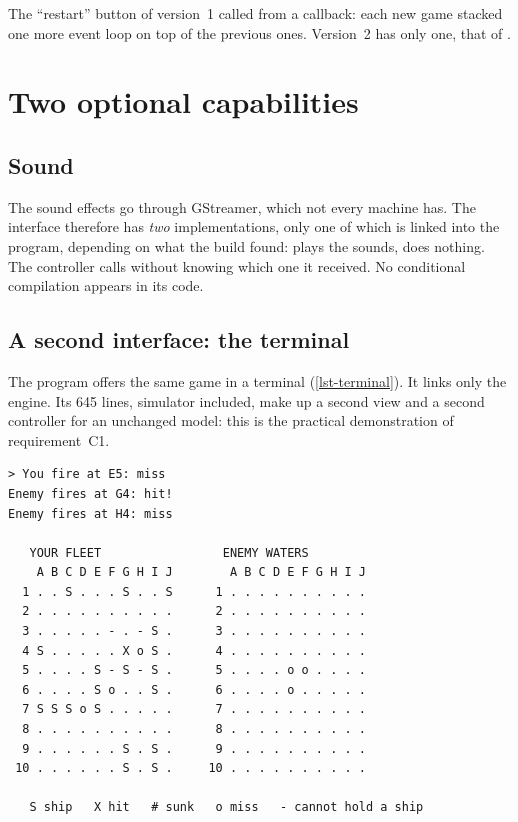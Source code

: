 \begin{attention}
    The \enquote{restart} button of version~1 called  from a callback: each
    new game stacked one more event loop on top of the previous ones. Version~2 has only one,
    that of .
\end{attention}

\section{Two optional capabilities}

\subsection{Sound}

The sound effects go through GStreamer, which not every machine has. The interface
 therefore has \emph{two} implementations, only one of which is linked into
the program, depending on what the build found:  plays the sounds,
 does nothing. The controller calls  without
knowing which one it received. No conditional compilation appears in its code.

\subsection{A second interface: the terminal}

The program  offers the same game in a terminal
(\cref{lst-terminal}). It links only the engine. Its \num{645} lines, simulator included,
make up a second view and a second controller for an unchanged model: this is the practical
demonstration of requirement~C1.

\begin{lstlisting}[language={}, basicstyle=\ttfamily\footnotesize,
                   caption={Excerpt from a game in a terminal
                            (\code{battleship-cli play -{}-seed 7 -{}-level hard}): the computer
                            hits at G4, the model excludes the diagonals, then it looks for
                            the rest of the ship.},
                   label={lst-terminal}]
> You fire at E5: miss
Enemy fires at G4: hit!
Enemy fires at H4: miss

   YOUR FLEET                 ENEMY WATERS
    A B C D E F G H I J        A B C D E F G H I J
  1 . . S . . . S . . S      1 . . . . . . . . . .
  2 . . . . . . . . . .      2 . . . . . . . . . .
  3 . . . . . - . - S .      3 . . . . . . . . . .
  4 S . . . . . X o S .      4 . . . . . . . . . .
  5 . . . . S - S - S .      5 . . . . o o . . . .
  6 . . . . S o . . S .      6 . . . . o . . . . .
  7 S S S o S . . . . .      7 . . . . . . . . . .
  8 . . . . . . . . . .      8 . . . . . . . . . .
  9 . . . . . . S . S .      9 . . . . . . . . . .
 10 . . . . . . S . S .     10 . . . . . . . . . .

   S ship   X hit   # sunk   o miss   - cannot hold a ship
\end{lstlisting}
